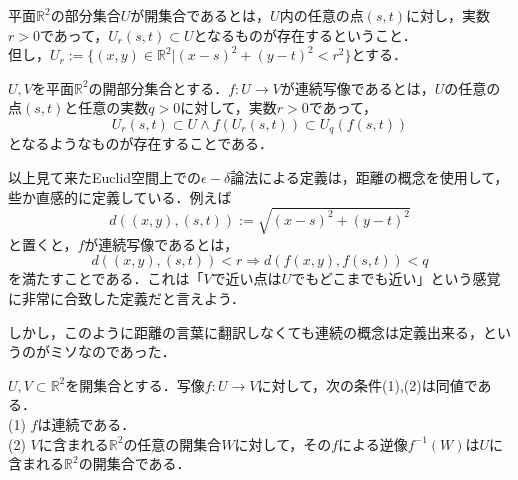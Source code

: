 \documentclass[uplatex, 12pt, a4paper, dvipdfmx]{jsarticle}
\begin{document}
\begin{shadebox}\begin{definition}
    平面$\mathbb{R}^2$の部分集合$U$が開集合であるとは，$U$内の任意の点$(s,t)$に対し，実数$r>0$であって，$U_r(s,t)\subset U$となるものが存在するということ．\\
    但し，$U_r := \{ (x,y)\in\mathbb{R}^2 | (x-s)^2 + (y-t)^2 < r^2 \}$とする．
\end{definition}\end{shadebox}

\begin{shadebox}\begin{definition}
    $U,V$を平面$\mathbb{R}^2$の開部分集合とする．$f:U\longrightarrow V$が連続写像であるとは，$U$の任意の点$(s,t)$と任意の実数$q>0$に対して，実数$r>0$であって，$$U_r(s,t)\subset U \wedge f(U_r(s,t))\subset U_q(f(s,t))$$となるようなものが存在することである．
\end{definition}\end{shadebox}

以上見て来たEuclid空間上での$\epsilon -\delta$論法による定義は，距離の概念を使用して，些か直感的に定義している．例えば$$d((x,y),(s,t)):=\sqrt{(x-s)^2+(y-t)^2}$$と置くと，$f$が連続写像であるとは，$$d((x,y),(s,t))<r\Longrightarrow d(f(x,y),f(s,t))<q$$を満たすことである．これは「$V$で近い点は$U$でもどこまでも近い」という感覚に非常に合致した定義だと言えよう．\par
しかし，このように距離の言葉に翻訳しなくても連続の概念は定義出来る，というのがミソなのであった．

\begin{shadebox}\begin{definition}[連続写像の特徴付け]
    $U,V\subset\mathbb{R}^2$を開集合とする．写像$f:U\longrightarrow V$に対して，次の条件(1),(2)は同値である．\\
    (1) $f$は連続である．\\
    (2) $V$に含まれる$\mathbb{R}^2$の任意の開集合$W$に対して，その$f$による逆像$f^{-1}(W)$は$U$に含まれる$\mathbb{R}^2$の開集合である．
\end{definition}\end{shadebox}
\end{document}

